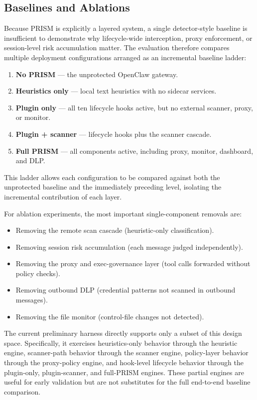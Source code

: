 \subsection{Baselines and Ablations}

Because PRISM is explicitly a layered system, a single detector-style baseline is insufficient to demonstrate why lifecycle-wide interception, proxy enforcement, or session-level risk accumulation matter. The evaluation therefore compares multiple deployment configurations arranged as an incremental baseline ladder:

\begin{enumerate}[leftmargin=1.5em]
  \item \textbf{No PRISM} --- the unprotected OpenClaw gateway.
  \item \textbf{Heuristics only} --- local text heuristics with no sidecar services.
  \item \textbf{Plugin only} --- all ten lifecycle hooks active, but no external scanner, proxy, or monitor.
  \item \textbf{Plugin + scanner} --- lifecycle hooks plus the scanner cascade.
  \item \textbf{Full PRISM} --- all components active, including proxy, monitor, dashboard, and DLP.
\end{enumerate}

This ladder allows each configuration to be compared against both the unprotected baseline and the immediately preceding level, isolating the incremental contribution of each layer.

For ablation experiments, the most important single-component removals are:

\begin{itemize}[leftmargin=1.5em]
  \item Removing the remote scan cascade (heuristic-only classification).
  \item Removing session risk accumulation (each message judged independently).
  \item Removing the proxy and exec-governance layer (tool calls forwarded without policy checks).
  \item Removing outbound DLP (credential patterns not scanned in outbound messages).
  \item Removing the file monitor (control-file changes not detected).
\end{itemize}

The current preliminary harness directly supports only a subset of this design space. Specifically, it exercises heuristics-only behavior through the heuristic engine, scanner-path behavior through the scanner engine, policy-layer behavior through the proxy-policy engine, and hook-level lifecycle behavior through the plugin-only, plugin-scanner, and full-PRISM engines. These partial engines are useful for early validation but are not substitutes for the full end-to-end baseline comparison.

